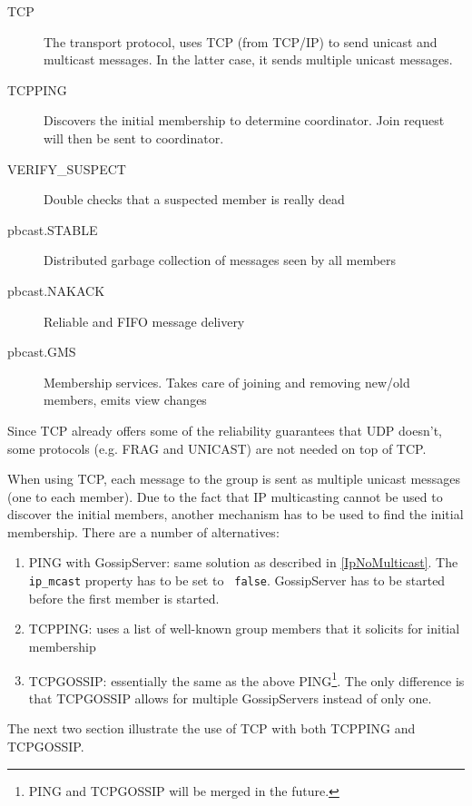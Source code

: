     \begin{description}
    \item[TCP] The transport protocol, uses TCP (from TCP/IP) to send unicast and
               multicast messages. In the latter case, it sends multiple unicast
               messages.
    \item[TCPPING] Discovers the initial membership to determine coordinator. Join
                   request will then be sent to coordinator.
    \item[VERIFY\_SUSPECT] Double checks that a suspected member is really dead
    \item[pbcast.STABLE] Distributed garbage collection of messages seen by all
                         members
    \item[pbcast.NAKACK] Reliable and FIFO message delivery
    \item[pbcast.GMS] Membership services. Takes care of joining and removing new/old
                      members, emits view changes
    \end{description}

	   
    Since TCP already offers some of the reliability guarantees that UDP doesn't,
    some protocols (e.g. FRAG and UNICAST) are not needed on top of TCP.

    When using TCP, each message to the group is sent as multiple unicast messages
    (one to each member). Due to the fact that IP multicasting cannot be used to
    discover the initial members, another mechanism has to be used to find the
    initial membership. There are a number of alternatives:

    \begin{enumerate}
    \item PING with GossipServer: same solution as described in
          \ref{IpNoMulticast}. The {\tt ip\_mcast} property has to be set to {\tt
          false}. GossipServer has to be started before the first member is started.
    \item TCPPING: uses a list of well-known group members that it solicits for
                   initial membership
    \item TCPGOSSIP: essentially the same as the above PING\footnote{PING and
                     TCPGOSSIP will be merged in the future.}. The only difference is
                     that TCPGOSSIP allows for multiple GossipServers instead of only
                     one.
    \end{enumerate}

    The next two section illustrate the use of TCP with both TCPPING and TCPGOSSIP.




